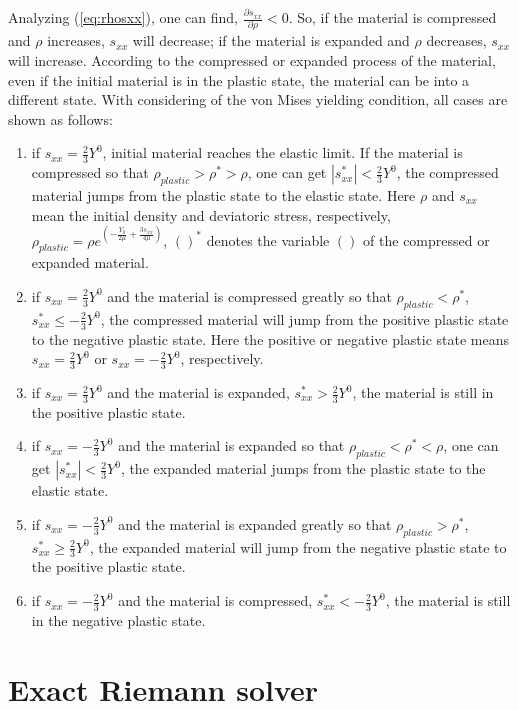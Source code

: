 \documentclass{article}
\numberwithin{equation}{section}
\numberwithin{table}{section}
\begin{document}
Analyzing (\ref{eq:rhosxx}), one can find, $\frac{\partial s_{xx}}{\partial \rho}<0$. So, if the material is compressed and $\rho$ increases, $s_{xx}$ will decrease; if the material is expanded and $\rho$ decreases, $s_{xx}$ will increase. According to the compressed or expanded process of the material,  even if the initial material is in the plastic state, the material can be into a different state. With considering of the von Mises yielding condition, all cases are shown as follows:
\begin{enumerate}
  \item if $s_{xx}=\frac{2}{3}Y^{0}$, initial material reaches the elastic limit. If the material is compressed so that $\rho_{plastic}>\rho^{*}>\rho$, one can get $|s_{xx}^{*}|<\frac{2}{3}Y^{0}$, the compressed material jumps from the plastic state to the elastic state. Here $\rho$ and $s_{xx}$ mean the initial density and deviatoric stress, respectively, $\rho_{plastic} = \rho e^{\left(-\frac{Y_0}{2\mu}+\frac{3 s_{xx}}{4\mu}\right)}$, $( )^{*}$ denotes the variable $( )$ of the compressed or expanded material.
  \item if $s_{xx}=\frac{2}{3}Y^{0}$ and the material is compressed greatly so that  $\rho_{plastic}<\rho^{*}$, $s_{xx}^{*}\leq - \frac{2}{3}Y^{0}$, the compressed material will jump from the positive plastic state to the negative plastic state. Here the positive or negative plastic state means $s_{xx}=\frac{2}{3}Y^{0}$ or $s_{xx}=-\frac{2}{3}Y^{0}$, respectively.
  \item if $s_{xx}=\frac{2}{3}Y^{0}$ and  the material is expanded, $s_{xx}^{*}>\frac{2}{3}Y^{0}$, the material is still in the positive plastic state.
  \item if $s_{xx}=-\frac{2}{3}Y^{0}$ and the material is expanded so that $\rho_{plastic}<\rho^{*}<\rho$, one can get $|s_{xx}^{*}|<\frac{2}{3}Y^{0}$, the expanded material jumps from the plastic state to the elastic state.
  \item if $s_{xx}=-\frac{2}{3}Y^{0}$ and the material is expanded greatly so that  $\rho_{plastic}>\rho^{*}$, $s_{xx}^{*}\geq  \frac{2}{3}Y^{0}$, the expanded material will jump from the negative plastic state to the  positive plastic state.
  \item if $s_{xx}=-\frac{2}{3}Y^{0}$ and  the material is compressed, $s_{xx}^{*}<-\frac{2}{3}Y^{0}$, the material is still in the negative plastic state.
\end{enumerate}

\section{Exact Riemann solver} %
\end{document}
